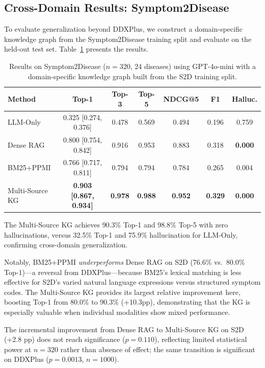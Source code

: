 \documentclass[preprint,12pt]{elsarticle}
\begin{document}
\subsection{Cross-Domain Results: Symptom2Disease}
\label{sec:cross_domain}

To evaluate generalization beyond DDXPlus, we construct a domain-specific knowledge graph from the Symptom2Disease training split and evaluate on the held-out test set. Table~\ref{tab:s2d} presents the results.

\begin{table}[t]
\centering
\caption{Results on Symptom2Disease ($n{=}320$, 24 diseases) using GPT-4o-mini with a domain-specific knowledge graph built from the S2D training split.}
\label{tab:s2d}
\begin{tabular}{lcccccc}
\toprule
\textbf{Method} & \textbf{Top-1} & \textbf{Top-3} & \textbf{Top-5} & \textbf{NDCG@5} & \textbf{F1} & \textbf{Halluc.} \\
\midrule
LLM-Only       & 0.325 [0.274, 0.376] & 0.478 & 0.569 & 0.494 & 0.196 & 0.759 \\
Dense RAG       & 0.800 [0.754, 0.842] & 0.916 & 0.953 & 0.883 & 0.318 & \textbf{0.000} \\
BM25+PPMI       & 0.766 [0.717, 0.811] & 0.794 & 0.794 & 0.784 & 0.265 & 0.004 \\
Multi-Source KG & \textbf{0.903 [0.867, 0.934]} & \textbf{0.978} & \textbf{0.988} & \textbf{0.952} & \textbf{0.329} & \textbf{0.000} \\
\bottomrule
\end{tabular}
\end{table}

The Multi-Source KG achieves 90.3\% Top-1 and 98.8\% Top-5 with zero hallucinations, versus 32.5\% Top-1 and 75.9\% hallucination for LLM-Only, confirming cross-domain generalization.

Notably, BM25+PPMI \emph{underperforms} Dense RAG on S2D (76.6\% vs.\ 80.0\% Top-1)---a reversal from DDXPlus---because BM25's lexical matching is less effective for S2D's varied natural language expressions versus structured symptom codes. The Multi-Source KG provides its largest relative improvement here, boosting Top-1 from 80.0\% to 90.3\% (+10.3pp), demonstrating that the KG is especially valuable when individual modalities show mixed performance.

The incremental improvement from Dense RAG to Multi-Source KG on S2D (+2.8 pp) does not reach significance ($p{=}0.110$), reflecting limited statistical power at $n{=}320$ rather than absence of effect; the same transition is significant on DDXPlus ($p{=}0.0013$, $n{=}1000$).
\end{document}
